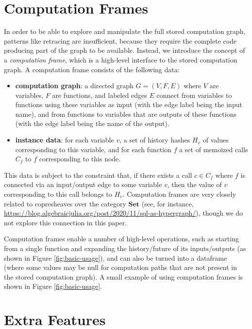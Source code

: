 \documentclass[11pt,twoside=semi,openright,numbers=noenddot]{scrartcl}
\begin{document}
\section{Computation Frames}
\label{section:}

In order to be able to explore and manipulate the full stored computation graph,
patterns like retracing are insufficient, because they require the complete code
producing part of the graph to be available. Instead, we introduce the concept
of a \emph{computation frame}, which is a high-level interface to the stored
computation graph. A computation frame consists of the following data:
\begin{itemize}
\item \textbf{computation graph}: a directed graph $G=(V,F,E)$ where $V$ are variables, $F$ are functions, and labeled edges $E$ connect from variables to functions using these variables as input (with the edge label being the input name), and from functions to variables that are outputs of these functions (with the edge label being the name of the output).
\item \textbf{instance data}: for each variable $v$, a set of history hashes $H_v$ of values corresponding to this variable, and for each function $f$ a set of memoized calls $C_f$ to $f$ corresponding to this node. 
\end{itemize}
This data is subject to the constraint that, if there exists a call $c\in C_f$
where $f$ is connected via an input/output edge to some variable $v$, then the
value of $v$ corresponding to this call belongs to $H_v$. Computation frames are
very closely related to copresheaves over the category $\textbf{Set}$ (see, for
instance,
\url{https://blog.algebraicjulia.org/post/2020/11/sql-as-hypergraph/}), though we do not explore this connection in this paper.

Computation frames enable a number of high-level operations, such as starting
from a single function and expanding the history/future of its inputs/outputs
(as shown in Figure \ref{fig:basic-usage}), and can also be turned into a
dataframe (where some values may be null for computation paths that are not
present in the stored computation graph). A small example of using computation
frames is shown in Figure \ref{fig:basic-usage}.

\section{Extra Features}
\label{section:}
\end{document}
